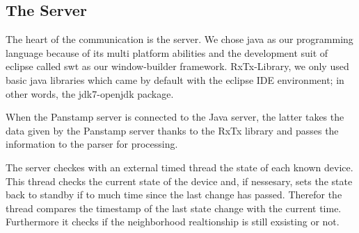 \subsection{The Server}
The heart of the communication is the server. We chose java\cite{java} as our
programming language because of its multi platform abilities and the development
suit of eclipse\cite{eclipse} called swt\cite{swt} as our window-builder
framework.%
RxTx-Library\cite{rxtx}, we only used basic java libraries which came by default
with the eclipse IDE\cite{ide} environment; in other words, the
jdk7-openjdk\cite{open_jdk} package. %

When the Panstamp server is connected to the Java server, the latter takes the data given by the Panstamp server thanks to the RxTx library \cite{rxtx} and passes the information to the parser for processing. %


The server checkes with an external timed thread the state of each known device.
This thread checks the current state of the device and, if nessesary, sets the
state back to standby if to much time since the last change has passed. Therefor
the thread compares the timestamp of the last state change with the current
time. Furthermore it checks if the neighborhood realtionship is still exsisting
or not.

